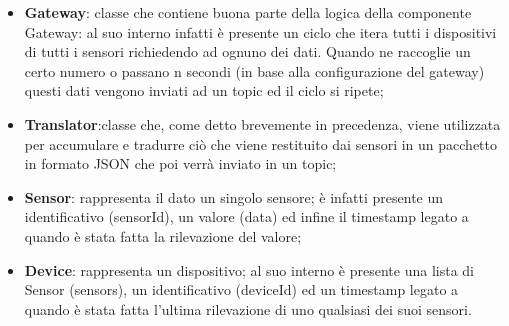 \begin{landscape}
\begin{itemize}
		\item \textbf{Gateway}: classe che contiene buona parte della logica della componente Gateway: al suo interno infatti è presente un ciclo che itera tutti i dispositivi di tutti i sensori richiedendo ad ognuno dei dati. Quando ne raccoglie un certo numero o passano n secondi (in base alla configurazione del gateway) questi dati vengono inviati ad un topic ed il ciclo si ripete;
		\item \textbf{Translator}:classe che, come detto brevemente in precedenza, viene utilizzata per accumulare e tradurre ciò che viene restituito dai sensori in un pacchetto in formato JSON che poi verrà inviato in un topic;
		\item \textbf{Sensor}: rappresenta il dato un singolo sensore; è infatti presente un identificativo (sensorId), un valore (data) ed infine il timestamp legato a quando è stata fatta la rilevazione del valore;
		\item \textbf{Device}: rappresenta un dispositivo; al suo interno è presente una lista di Sensor (sensors), un identificativo (deviceId) ed un timestamp legato a quando è stata fatta l'ultima rilevazione di uno qualsiasi dei suoi sensori.
	\end{itemize}
	\end{landscape}
		
